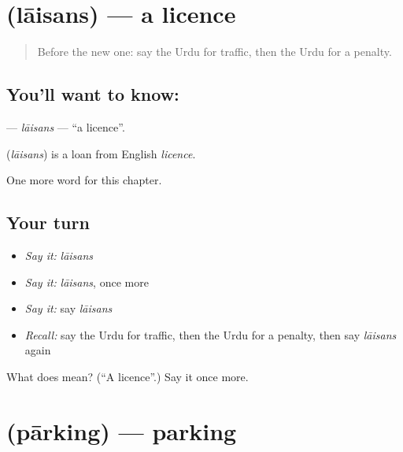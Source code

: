 \section[\texorpdfstring{\ur{لائسنس} (lāisans)}{لائسنس (lāisans)}]{ (lāisans) — a licence}

\label{lesson:UR-C255-laisans}



\begin{quote}
Before the new one: say the Urdu for traffic, then the Urdu for a penalty.
\end{quote}

\subsection*{You'll want to know: }
\textbf{} — \emph{lāisans} — \textquotedblleft{}a licence\textquotedblright{}.

\begin{cousinweb}
\textbf{} (\emph{lāisans}) is a loan from English \emph{licence}.
\end{cousinweb}

\begin{grammarlens}[title={What you've built}]
One more word for this chapter.
\end{grammarlens}

\subsection*{Your turn}
\begin{itemize}
\raggedright
  \item \emph{Say it:} \emph{lāisans}
  \item \emph{Say it:} \emph{lāisans}, once more
  \item \emph{Say it:} say \emph{lāisans}
  \item \emph{Recall:} say the Urdu for traffic, then the Urdu for a penalty, then say \emph{lāisans} again
\end{itemize}

\begin{tcolorbox}[breakable,colback=teal!4,colframe=teal!35!black,title={Before you move on}]
What does  mean? (\textquotedblleft{}A licence\textquotedblright{}.) Say it once more.
\end{tcolorbox}
\section[\texorpdfstring{\ur{پارکنگ} (pārking)}{پارکنگ (pārking)}]{ (pārking) — parking}

